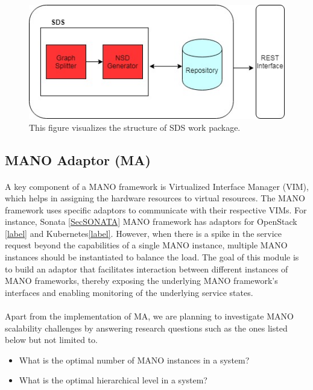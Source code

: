 \begin{figure}[h]
	\centering
	\includegraphics[width=0.7\linewidth]{figures/splitter_diagram}
	\caption{This figure visualizes the structure of SDS work package. }
	\label{fig:splitterDiagram}
\end{figure}

\subsection{MANO Adaptor (MA)}
\paragraph{}

A key component of a MANO framework is Virtualized Interface Manager (VIM),  which helps in assigning the hardware resources to virtual resources. The MANO framework uses specific adaptors to communicate with their respective VIMs. For instance, Sonata \ref{SecSONATA} MANO framework has adaptors for OpenStack \ref{label} and Kubernetes\ref{label}. However, when there is a spike in the service request beyond the capabilities of a single MANO instance, multiple MANO instances should be instantiated to balance the load. The goal of this module is to build an adaptor that facilitates interaction between different instances of MANO frameworks, thereby exposing the underlying MANO framework's interfaces and enabling monitoring of the underlying service states.

\paragraph{}
Apart from the implementation of MA, we are planning to investigate MANO scalability challenges by answering research questions such as the ones listed below but not limited to.
\begin{itemize}
	\item What is the optimal number of MANO instances in a system?
	\item What is the optimal hierarchical level in a system?
\end{itemize}


